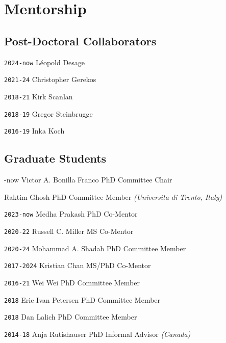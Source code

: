\section*{Mentorship}

\TabPositions{6em,17em,26em}

\subsection*{Post-Doctoral Collaborators}

\noindent \texttt{2024-now} \tab Léopold Desage 

\noindent \texttt{2021-24} \tab Christopher Gerekos %

\noindent \texttt{2018-21} \tab Kirk Scanlan %

\noindent \texttt{2018-19} \tab Gregor Steinbrugge %

\noindent \texttt{2016-19} \tab Inka Koch %

\vspace{-1em}
\subsection*{Graduate Students}
\TabPositions{6em,17em,28em}

-now \tab Victor A. Bonilla Franco \tab PhD Committee Chair

 \tab Raktim Ghosh \tab PhD Committee Member \textit{(Universita di Trento, Italy)}

\noindent \texttt{2023-now} \tab Medha Prakash \tab PhD Co-Mentor

\noindent \texttt{2020-22} \tab Russell C. Miller \tab MS Co-Mentor

\noindent \texttt{2020-24} \tab Mohammad A. Shadab \tab PhD Committee Member

\noindent \texttt{2017-2024} \tab Kristian Chan \tab MS/PhD Co-Mentor

\noindent \texttt{2016-21} \tab Wei Wei \tab PhD Committee Member

\noindent \texttt{2018} \tab Eric Ivan Petersen  \tab PhD Committee Member

\noindent \texttt{2018} \tab Dan Lalich \tab PhD Committee Member

\noindent \texttt{2014-18} \tab Anja Rutishauser \tab PhD Informal Advisor \textit{(Canada)}

